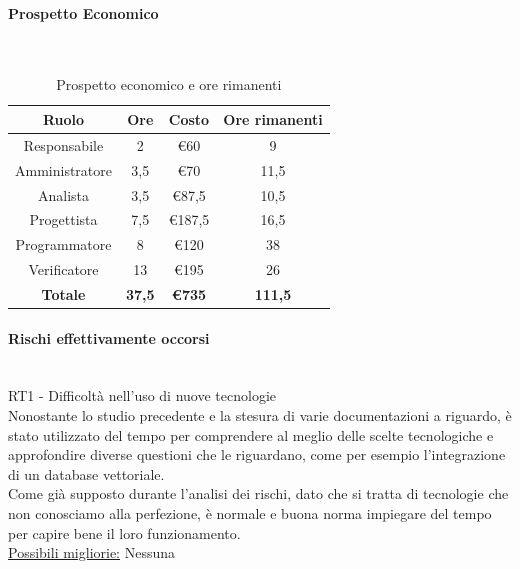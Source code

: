 \documentclass{article}
\begin{document}
                \paragraph{Prospetto Economico}\mbox{}\\
                \begin{table}[H]
                    \centering
                    \begin{tabular}{|c|c|c|c|}
                    \hline
                    \textbf{Ruolo}  & \textbf{Ore}  & \textbf{Costo} & \textbf{Ore rimanenti} \\ \hline
                    Responsabile    & 2             & €60            & 9                     \\ \hline
                    Amministratore  & 3,5           & €70            & 11,5                     \\ \hline
                    Analista        & 3,5           & €87,5          & 10,5                     \\ \hline
                    Progettista     & 7,5           & €187,5         & 16,5                     \\ \hline
                    Programmatore   & 8            & €120           & 38                     \\ \hline
                    Verificatore    & 13            & €195           & 26                     \\ \hline
                    \textbf{Totale} & \textbf{37,5} & \textbf{\euro735}   & \textbf{111,5}           \\ \hline
                    \end{tabular}
                    \caption{Prospetto economico e ore rimanenti}
                \end{table}


                \paragraph{Rischi effettivamente occorsi}\mbox{}\\
                RT1 - Difficoltà nell’uso di nuove tecnologie \\
                Nonostante lo studio precedente e la stesura di varie documentazioni a riguardo, è stato utilizzato del tempo per comprendere al meglio delle scelte tecnologiche e approfondire diverse questioni che le riguardano, come per esempio l’integrazione di un database vettoriale. \\
                Come già supposto durante l’analisi dei rischi, dato che si tratta di tecnologie che non conosciamo alla perfezione, è normale e buona norma impiegare del tempo per capire bene il loro funzionamento. \\
                \underline{Possibili migliorie:} Nessuna
\end{document}
